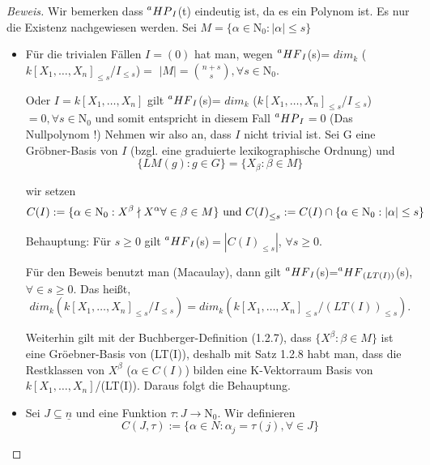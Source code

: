 \documentclass{article}
\newcommand*{\R}{k[X_{1},\ldots,X_{n}]}
\newcommand*{\indx}[2]{{#1}_{#2}}
\newcommand*{\potx}[2]{{#1}^{#2}}
\newcommand*{\N}{\mathrm{N}_0}
\newcommand*{\hf}[1]{$\prescript{a}{}{HF}_{#1}$}
\newcommand*{\hp}[1]{$\prescript{a}{}{HP}_{#1}$}
\begin{document}
\begin{proof}[Beweis]
	Wir bemerken dass \hp{I}(t) eindeutig ist, da es ein Polynom ist. Es nur die Existenz nachgewiesen werden. Sei $M=\{\alpha \in \N:|\alpha|\leq s\}$
	\begin{itemize}
		\item Für die trivialen Fällen $I=(0)$ hat man, wegen \hf{I}(s)= $\indx{dim}{k}$ ($\indx{\R}{\leq s}$/$\indx{I}{\leq s}$)$=$ $\left|M\right|=\binom{n+s}{s}, \forall s\in \N$.
		
		Oder $I=\R$ gilt \hf{I}(s)= $\indx{dim}{k}$ ($\indx{\R}{\leq s}$/$\indx{I}{\leq s}$)$=0, \forall s\in \N$ und somit entspricht in diesem Fall \hp{I}$=0$ (Das Nullpolynom !)
		Nehmen wir also an, dass $I$ nicht trivial ist. Sei G eine Gröbner-Basis von $I$ (bzgl. eine graduierte lexikographische Ordnung) und 
		\begin{displaymath}
		\{LM(g):g\in G\}=\{\indx{X}{\beta}:\beta \in M \}
		\end{displaymath}
		
		wir setzen
		\begin{displaymath}
		C(I):=\{\alpha \in \N: \potx{X}{\beta} \nmid \potx{X}{\alpha} \forall \in \beta \in M \}
		\textnormal{ und } 
		\indx{C(I)}{\leq s}:= C(I) \cap \{\alpha \in \N:|\alpha|\leq s\}
		\end{displaymath}
		
Behauptung: Für $s\geq 0$ gilt \hf{I}(s)$=|\indx{C(I)}{\leq s}|$, $\forall s\geq 0$.

Für den Beweis benutzt man (Macaulay), dann gilt \hf{I}(s)=\hf{(LT(I))}(s), $\forall \in s\geq0$. Das heißt,
\begin{displaymath}
\indx{dim}{k} (\indx{\R}{\leq s}/\indx{I}{\leq s})=\indx{dim}{k}(\indx{\R}{\leq s}/\indx{(LT(I))}{\leq s}).
\end{displaymath}

Weiterhin gilt mit der Buchberger-Definition (1.2.7), dass $\{\potx{X}{\beta}:\beta \in M \}$ ist eine Gröebner-Basis von (LT(I)), deshalb mit Satz 1.2.8 habt man, dass die Restklassen von $\potx{X}{\beta}$ ($\alpha\in C(I)$) bilden eine K-Vektorraum Basis von $\R$/(LT(I)). Daraus folgt die Behauptung.

\item Sei $J\subseteq \underline{n}$ und eine Funktion $\tau:J\longrightarrow \N$. Wir definieren
\begin{displaymath}
C(J,\tau):=\{\alpha \in N: \indx{\alpha}{j}=\tau(j), \forall \in J  \}
\end{displaymath}


\end{itemize}
\end{proof}
\end{document}
